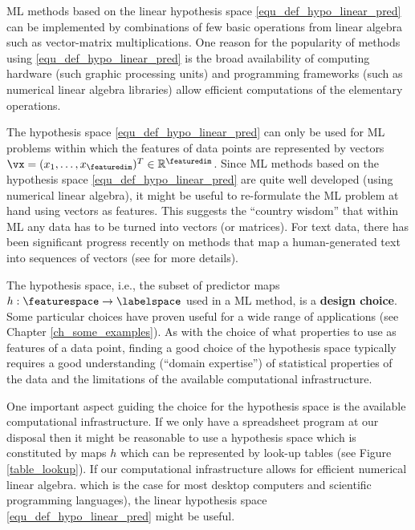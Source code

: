 \documentclass[12pt]{report}
\begin{document}
ML methods based on the linear hypothesis space \eqref{equ_def_hypo_linear_pred} 
can be implemented by combinations of few basic operations from linear algebra such 
as vector-matrix multiplications. One reason for the popularity of methods using 
\eqref{equ_def_hypo_linear_pred} is the broad availability of computing hardware 
(such graphic processing units) and programming frameworks (such as numerical linear 
algebra libraries) allow efficient computations of the elementary operations. 

The hypothesis space \eqref{equ_def_hypo_linear_pred} can only be used for ML problems 
within which the features of data points are represented by vectors $\vx = (x_{1},\ldots,x_{\featuredim})^{T} \in \mathbb{R}^{\featuredim}$. 
Since ML methods based on the hypothesis space \eqref{equ_def_hypo_linear_pred} are 
quite well developed (using numerical linear algebra), it might be useful to re-formulate 
the ML problem at hand using vectors as features. This suggests the ``country wisdom'' 
that within ML any data has to be turned into vectors (or matrices). For text data, there has 
been significant progress recently on methods that map a human-generated text into sequences 
of vectors (see \cite[Chap. 12]{Goodfellow-et-al-2016} for more details). 

The hypothesis space, i.e., the subset of predictor maps $h: \featurespace \rightarrow \labelspace$ 
used in a ML method, is a {\bf design choice}. Some particular choices have proven useful for 
a wide range of applications (see Chapter \ref{ch_some_examples}). As with the choice of 
what properties to use as features of a data point, finding a good choice of the hypothesis 
space typically requires a good understanding (``domain expertise'') of statistical properties 
of the data and the limitations of the available computational infrastructure. 

One important aspect guiding the choice for the hypothesis space is the available 
computational infrastructure. If we only have a spreadsheet program at our disposal 
then it might be reasonable to use a hypothesis space which is constituted by maps 
$h$ which can be represented by look-up tables (see Figure \ref{table_lookup}). 
If our computational infrastructure allows for efficient numerical linear algebra. 
which is the case for most desktop computers and scientific programming languages), 
the linear hypothesis space \eqref{equ_def_hypo_linear_pred} might be useful.
\end{document}
